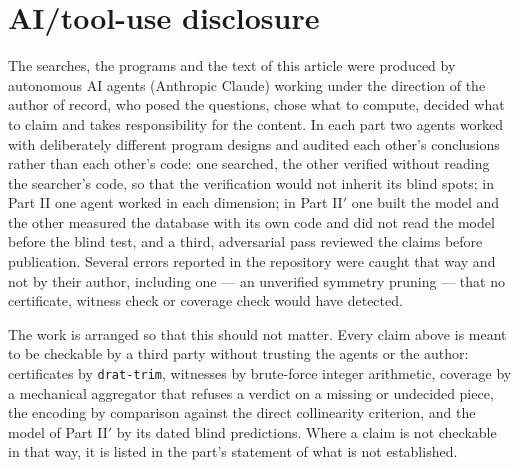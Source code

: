 \documentclass[11pt,a4paper]{article}
\begin{document}
\section{AI/tool-use disclosure}\label{s:disclosure}
The searches, the programs and the text of this article were produced by autonomous AI agents (Anthropic Claude) working under
the direction of the author of record, who posed the questions, chose what to compute, decided what to claim and takes
responsibility for the content.  In each part two agents worked with deliberately different program designs and audited each
other's conclusions rather than each other's code: one searched, the other verified without reading the searcher's code, so that
the verification would not inherit its blind spots; in Part II one agent worked in each dimension; in Part II$'$ one built the
model and the other measured the database with its own code and did not read the model before the blind test, and a third,
adversarial pass reviewed the claims before publication.  Several errors reported in the repository were caught that way and not
by their author, including one --- an unverified symmetry pruning --- that no certificate, witness check or coverage check would
have detected.

The work is arranged so that this should not matter.  Every claim above is meant to be checkable by a third
party without trusting the agents or the author: certificates by \texttt{drat-trim}, witnesses by brute-force
integer arithmetic, coverage by a mechanical aggregator that refuses a verdict on a missing or undecided piece,
the encoding by comparison against the direct collinearity criterion, and the model of Part II$'$ by its dated blind
predictions.  Where a claim is not checkable in that way, it is listed in the part's statement of what is not established.
\end{document}

